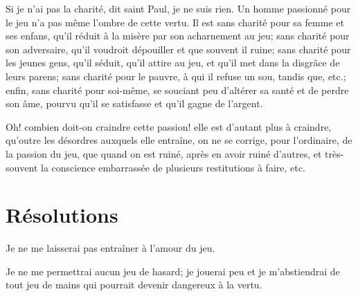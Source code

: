 \documentclass[instructions.tex]{subfiles}
\begin{document}
Si je n'ai pas la charité, dit saint Paul, je ne suis rien. Un homme passionné pour le jeu n'a pas même l'ombre de cette vertu. Il est sans charité pour sa femme et ses enfans, qu'il réduit à la misère par son acharnement au jeu; sans charité pour son adversaire, qu'il voudroit dépouiller et que souvent il ruine; sans charité pour les jeunes gens, qu'il séduit, qu'il attire au jeu, et qu'il met dans la disgrâce de leurs parens; sans charité pour le pauvre, à qui il refuse un sou, tandis que, etc.; enfin, sans charité pour soi-même, se souciant peu d'altérer sa santé et de perdre son âme, pourvu qu'il se satisfasse et qu'il gagne de l'argent.
 
Oh! combien doit-on craindre cette passion! elle est d'autant plus à craindre, qu'outre les désordres auxquels elle entraîne, on ne se corrige, pour l'ordinaire, de la passion du jeu, que quand on est ruiné, après en avoir ruiné d'autres, et très-souvent la conscience embarrassée de plusieurs restitutions à faire, etc.
 
\section{Résolutions}
 
\primo Je ne me laisserai pas entraîner à l'amour du jeu.

\secundo Je ne me permettrai aucun jeu de hasard; je jouerai peu et je m'abstiendrai de tout jeu de mains qui pourrait devenir dangereux à la vertu.
 
 
\end{document}
